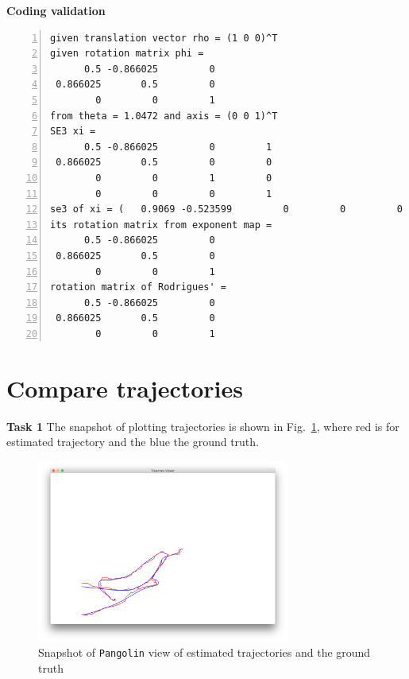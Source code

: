 \documentclass[12pt,a4paper]{article}
\begin{document}
    \textsf{\textbf{Coding validation}}
    \begin{lstlisting}[frame=single,numbers=left]
given translation vector rho = (1 0 0)^T
given rotation matrix phi = 
      0.5 -0.866025         0
 0.866025       0.5         0
        0         0         1
from theta = 1.0472 and axis = (0 0 1)^T
SE3 xi = 
      0.5 -0.866025         0         1
 0.866025       0.5         0         0
        0         0         1         0
        0         0         0         1
se3 of xi = (   0.9069 -0.523599         0         0         0    1.0472)^T
its rotation matrix from exponent map = 
      0.5 -0.866025         0
 0.866025       0.5         0
        0         0         1
rotation matrix of Rodrigues' =
      0.5 -0.866025         0
 0.866025       0.5         0
        0         0         1
    \end{lstlisting}


    \section{Compare trajectories}
    \textsf{\textbf{Task 1}}
    The snapshot of plotting trajectories is shown in Fig.~\ref{fig:draw_trajectory},
    where red is for estimated trajectory and the blue the ground truth.
    \begin{figure}[!h]
        \centering
        \includegraphics[height=6cm]{fig/draw_trajectory.png}
        \caption{Snapshot of \texttt{Pangolin} view of estimated trajectories and the ground truth}
        \label{fig:draw_trajectory}
    \end{figure}

    
\end{document}

